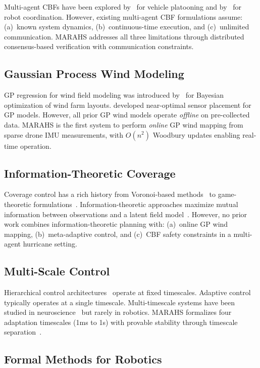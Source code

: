 \documentclass[11pt,twocolumn]{article}
\theoremstyle{definition}
\begin{document}
Multi-agent CBFs have been explored by~\citet{Wang2018} for vehicle platooning and by~\citet{Glotfelter2017} for robot coordination. However, existing multi-agent CBF formulations assume: (a)~known system dynamics, (b)~continuous-time execution, and (c)~unlimited communication. MARAHS addresses all three limitations through distributed consensus-based verification with communication constraints.

\subsection{Gaussian Process Wind Modeling}

GP regression for wind field modeling was introduced by~\citet{Srinivas2010} for Bayesian optimization of wind farm layouts. \citet{Krause2008} developed near-optimal sensor placement for GP models. However, all prior GP wind models operate \emph{offline} on pre-collected data. MARAHS is the first system to perform \emph{online} GP wind mapping from sparse drone IMU measurements, with $O(n^2)$ Woodbury updates enabling real-time operation.

\subsection{Information-Theoretic Coverage}

Coverage control has a rich history from Voronoi-based methods~\citep{Cortes2004} to game-theoretic formulations~\citep{Schwager2011}. Information-theoretic approaches maximize mutual information between observations and a latent field model~\citep{Krause2008,Singh2009}. However, no prior work combines information-theoretic planning with: (a)~online GP wind mapping, (b)~meta-adaptive control, and (c)~CBF safety constraints in a multi-agent hurricane setting.

\subsection{Multi-Scale Control}

Hierarchical control architectures~\citep{Rizk2019} operate at fixed timescales. Adaptive control~\citep{Ioannou2012} typically operates at a single timescale. Multi-timescale systems have been studied in neuroscience~\citep{Meehan2020} but rarely in robotics. MARAHS formalizes four adaptation timescales (1ms to 1s) with provable stability through timescale separation~\citep{Khalil2002}.

\subsection{Formal Methods for Robotics}
\end{document}

